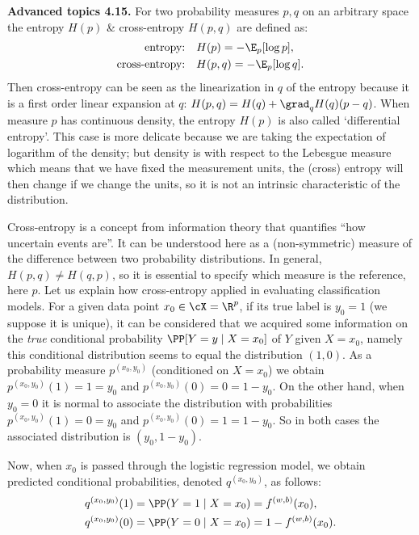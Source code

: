 \begin{tcolorbox}[advancedbox]
\textbf{Advanced topics 4.15.} For two probability measures $p, q$ on an arbitrary space the entropy $H(p)$ \& cross-entropy $H(p, q)$ are defined as:
\begin{align}
\text{entropy:} \quad & H(p) = -\E_p[\log p], \label{eq:ch4-entropy-def}\\
\text{cross-entropy:} \quad & H(p, q) = -\E_p[\log q]. \label{eq:ch4-ce-def}
\end{align}
Then cross-entropy can be seen as the linearization in $q$ of the entropy
because it is a first order linear expansion at $q$: $H(p, q) = H(q) + \grad_q H(q) (p - q)$.
When measure $p$ has continuous density, the entropy $H(p)$ is also called
`differential entropy'. This case is more delicate because we are taking
the expectation of logarithm of the density; but density is with respect
to the Lebesgue measure which means that we have fixed the measurement
units, the (cross) entropy will then change if we change the units, so it
is not an intrinsic characteristic of the distribution.
\end{tcolorbox}

Cross-entropy is a concept from information theory that quantifies ``how
uncertain events are''. It can be understood here as a (non-symmetric) measure
of the difference between two probability distributions. In general, $H(p, q) \ne H(q, p)$,
so it is essential to specify which measure is the reference, here $p$.
Let us explain how cross-entropy applied in evaluating classification models.
For a given data point $x_0 \in \cX = \R^p$, if its true label is $y_0 = 1$ (we suppose
it is unique), it can be considered that we acquired some information on the
\emph{true} conditional probability $\PP[Y = y \mid X = x_0]$ of $Y$ given $X = x_0$, namely this
conditional distribution seems to equal the distribution $(1, 0)$. As a probability measure $p^{(x_0, y_0)}$ (conditioned on $X = x_0$) we obtain $p^{(x_0, y_0)}(1) = 1 = y_0$
and $p^{(x_0, y_0)}(0) = 0 = 1 - y_0$. On the other hand, when $y_0 = 0$ it is normal
to associate the distribution with probabilities $p^{(x_0, y_0)}(1) = 0 = y_0$ and
$p^{(x_0, y_0)}(0) = 1 = 1 - y_0$. So in both cases the associated distribution is
$(y_0, 1 - y_0)$.

Now, when $x_0$ is passed through the logistic regression model, we obtain
predicted conditional probabilities, denoted $q^{(x_0, y_0)}$, as follows:
\begin{align}
q^{(x_0, y_0)}(1) &= \PP(Y = 1 \mid X = x_0) = f^{(w,b)}(x_0), \label{eq:ch4-q-one}\\
q^{(x_0, y_0)}(0) &= \PP(Y = 0 \mid X = x_0) = 1 - f^{(w,b)}(x_0). \label{eq:ch4-q-zero}
\end{align}

